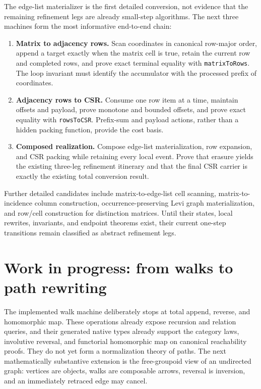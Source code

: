 \documentclass[11pt]{article}
\theoremstyle{remark}
\newcommand{\code}[1]{\texttt{#1}}
\begin{document}
The edge-list materializer is the first detailed conversion, not evidence that
the remaining refinement legs are already small-step algorithms.  The next
three machines form the most informative end-to-end chain:
\begin{enumerate}[label=\arabic*.,leftmargin=2.2em]
  \item \textbf{Matrix to adjacency rows.}  Scan coordinates in canonical
        row-major order, append a target exactly when the matrix cell is true,
        retain the current row and completed rows, and prove exact terminal
        equality with \code{matrixToRows}.  The loop invariant must identify
        the accumulator with the processed prefix of coordinates.
  \item \textbf{Adjacency rows to CSR.}  Consume one row item at a time,
        maintain offsets and payload, prove monotone and bounded offsets, and
        prove exact equality with \code{rowsToCSR}.  Prefix-sum and payload
        actions, rather than a hidden packing function, provide the cost basis.
  \item \textbf{Composed realization.}  Compose edge-list materialization,
        row expansion, and CSR packing while retaining every local event.
        Prove that erasure yields the existing three-leg refinement itinerary
        and that the final CSR carrier is exactly the existing total
        conversion result.
\end{enumerate}

Further detailed candidates include matrix-to-edge-list cell scanning,
matrix-to-incidence column construction, occurrence-preserving Levi graph
materialization, and row/cell construction for distinction matrices.  Until
their states, local rewrites, invariants, and endpoint theorems exist, their
current one-step transitions remain classified as abstract refinement legs.

\section{Work in progress: from walks to path rewriting}
\label{app:walk-rewriting}

The implemented walk machine deliberately stops at total append, reverse, and
homomorphic map.  These operations already expose recursion and relation
queries, and their generated native types already support the category laws,
involutive reversal, and functorial homomorphic map on canonical reachability
proofs.  They do not yet form a normalization theory of paths.  The next
mathematically substantive extension is the free-groupoid view of an
undirected graph: vertices are objects, walks are composable arrows, reversal
is inversion, and an immediately retraced edge may cancel.
\end{document}
